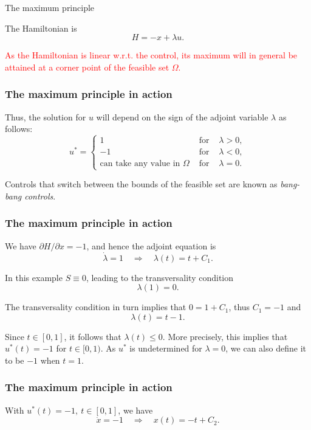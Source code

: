 \documentclass[10pt]{beamer}
\theoremstyle{definition}
\begin{document}
\begin{section}{The maximum principle}
\begin{frame}[fragile]
\begin{example}
The Hamiltonian is
\[ H = -x + \lambda u .\]\bigskip \pause

\textcolor{red}{As the Hamiltonian is linear w.r.t. the control, its maximum will in general be attained at a corner point of the feasible set $ \Omega $.}
\label{ex:bangbang}
\end{example}
\end{frame}

\begin{frame}[fragile]
\frametitle{The maximum principle in action}
\addtocounter{theorem}{-1}
\begin{example}[cont.]
Thus, the solution for $ u $ will depend on the sign of the adjoint variable $ \lambda $ as follows:
\[ u^* = \left\{\begin{array}{cll}
 1 &\text{ for }&\lambda>0,\\
 -1 &\text{ for }&\lambda<0,\\
\text{can take any value in }\Omega&\text{ for }&\lambda=0.
\end{array}\right. \]\bigskip

\alert{Controls that switch between the bounds of the feasible set are known as \emph{bang-bang controls}.}
\end{example}
\end{frame}

\begin{frame}[fragile]
\frametitle{The maximum principle in action}
\addtocounter{theorem}{-1}
\begin{example}[cont.]
We have $ \partial H/\partial x = -1 $, and hence the adjoint equation is \[ \dot{\lambda} = 1 \quad \Rightarrow \quad \lambda (t) = t + C_1. \]

In this example $ S\equiv 0 $, leading to the transversality condition \[ \lambda(1)=0. \]

The transversality condition in turn implies that $ 0=1+C_1 $, thus $ C_1=-1 $ and \[ \lambda(t)=t-1. \]

Since $ t\in [0,1] $, it follows that $ \lambda(t)\leq 0 $. More precisely, this implies that $ u^*(t)=-1 $ for $ t\in[0,1) $. As $ u^* $ is undetermined for $ \lambda = 0 $, we can also define it to be $ -1 $ when $ t=1 $.
\end{example}
\end{frame}

\begin{frame}[fragile]
\frametitle{The maximum principle in action}
\addtocounter{theorem}{-1}
\begin{example}[cont.]
With $ u^*(t)=-1,~t\in[0,1] $, we have \[ \dot{x}=-1 \quad \Rightarrow \quad x(t) = -t+C_2. \]


\end{example}
\end{frame}
\end{section}
\end{document}
